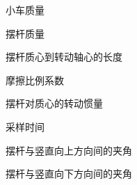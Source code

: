 \item[$M$] 小车质量
\item[$m$] 摆杆质量
\item[$l$] 摆杆质心到转动轴心的长度
\item[$b$] 摩擦比例系数
\item[$I$] 摆杆对质心的转动惯量
\item[$T$] 采样时间
\item[$\phi$] 摆杆与竖直向上方向间的夹角
\item[$\theta$] 摆杆与竖直向下方向间的夹角

